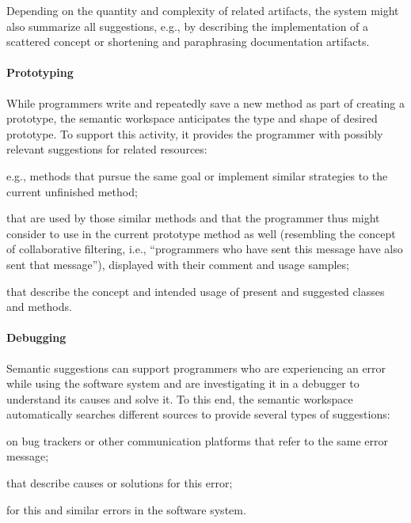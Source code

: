 	Depending on the quantity and complexity of related artifacts, the system might also summarize all suggestions, e.g., by describing the implementation of a scattered concept or shortening and paraphrasing documentation artifacts.

	\paragraph{Prototyping}
	While programmers write and repeatedly save a new method as part of creating a prototype, the semantic workspace anticipates the type and shape of desired prototype.
	To support this activity, it provides the programmer with possibly relevant suggestions for related resources:

	\begin{description}[noextralabelsep]
		\item[similar methods,] e.g., methods that pursue the same goal or implement similar strategies to the current unfinished method;
		\item[correlated methods and classes] that are used by those similar methods and that the programmer thus might consider to use in the current prototype method as well (resembling the concept of collaborative filtering, i.e., ``programmers who have sent this message have also sent that message''), displayed with their comment and usage samples;
		\item[documentation artifacts] that describe the concept and intended usage of present and suggested classes and methods.
	\end{description}

	\paragraph{Debugging}
	Semantic suggestions can support programmers who are experiencing an error while using the software system and are investigating it in a debugger to understand its causes and solve it.
	To this end, the semantic workspace automatically searches different sources to provide several types of suggestions:

	\begin{description}[noextralabelsep]
		\item[bug reports] on bug trackers or other communication platforms that refer to the same error message;
		\item[documentation artifacts] that describe causes or solutions for this error;
		\item[exception handlers] for this and similar errors in the software system.
	\end{description}

